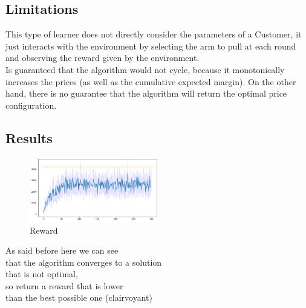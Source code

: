 \subsection{Limitations}
This type of learner does not directly consider the parameters of a Customer, it just interacts with the environment by selecting the arm to pull at each round and observing the reward given by the environment.\\
Is guaranteed that the algorithm would not cycle, because it monotonically increases the prices (as well as the cumulative expected margin). On the other hand, there is no guarantee that the algorithm will return the optimal price configuration.



\subsection{Results}
\begin{multicols}{2}
    \begin{figure}[H]
        \begin{center}
        \includegraphics[width=0.5\textwidth]{img/reward2.png}
        \caption{Reward}
        \label{fig:reward2}
        \end{center}
    \end{figure}
    \columnbreak
As said before here we can see\\ that the algorithm converges to a solution\\ that is not optimal,\\ so return a reward that is lower \\than the best possible one (clairvoyant)
\end{multicols}

